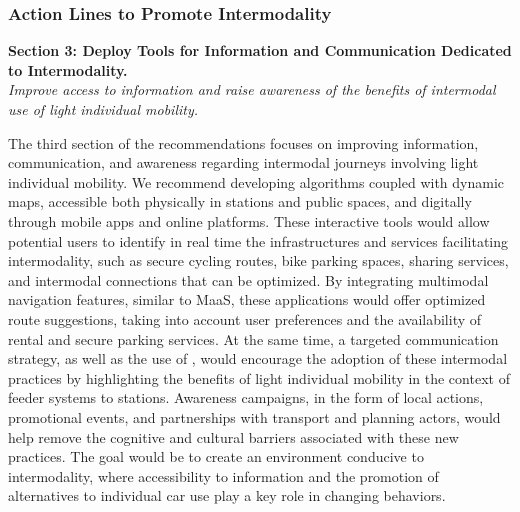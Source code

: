 \begin{refsegment}
\subsubsection*{Action Lines to Promote Intermodality
    \label{conclusion-generale:implications-mobilites}
    }

    \begin{displayquote}
\textbf{Section 3: Deploy Tools for Information and Communication Dedicated to Intermodality.}
\\
\textsl{Improve access to information and raise awareness of the benefits of intermodal use of light individual mobility.}
    \end{displayquote}
The third section of the recommendations focuses on improving information, communication, and awareness regarding intermodal journeys involving light individual mobility. We recommend developing algorithms coupled with dynamic maps, accessible both physically in stations and public spaces, and digitally through mobile apps and online platforms. These interactive tools would allow potential users to identify in real time the infrastructures and services facilitating intermodality, such as secure cycling routes, bike parking spaces, sharing services, and intermodal connections that can be optimized. By integrating multimodal navigation features, similar to \acrshort{MaaS}, these applications would offer optimized route suggestions, taking into account user preferences and the availability of rental and secure parking services. At the same time, a targeted communication strategy, as well as the use of , would encourage the adoption of these intermodal practices by highlighting the benefits of light individual mobility in the context of feeder systems to stations. Awareness campaigns, in the form of local actions, promotional events, and partnerships with transport and planning actors, would help remove the cognitive and cultural barriers associated with these new practices. The goal would be to create an environment conducive to intermodality, where accessibility to information and the promotion of alternatives to individual car use play a key role in changing behaviors.%


\end{refsegment}
